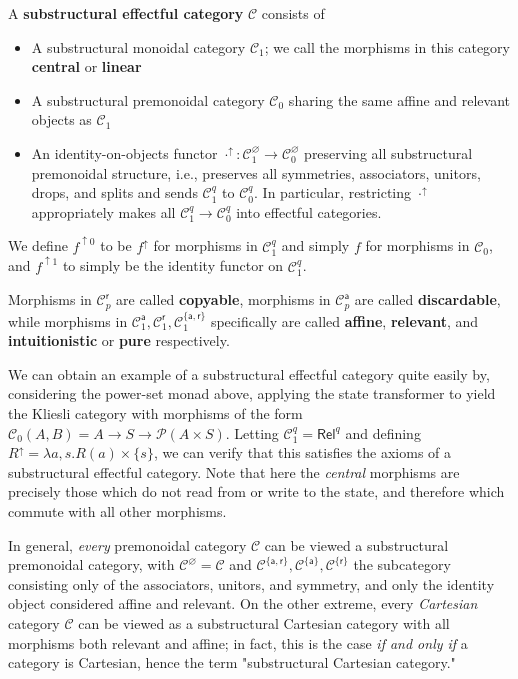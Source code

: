 \documentclass[acmsmall,screen,review]{acmart}
\newcommand{\mc}[1]{\ensuremath{\mathcal{#1}}}
\newcommand{\ms}[1]{\ensuremath{\mathsf{#1}}}
\newcommand{\upg}[2]{{#1}^{\uparrow #2}}
\begin{document}
\begin{definition}
  A \textbf{substructural effectful category} \(\mc{C}\) consists of
  \begin{itemize}
    \item A substructural monoidal category \(\mc{C}_1\); we call the morphisms
    in this category \textbf{central} or \textbf{linear}
    \item A substructural premonoidal category \(\mc{C}_0\) sharing the same
    affine and relevant objects as \(\mc{C}_1\)
    \item An identity-on-objects functor \(\upg{\cdot}{}: \mc{C}_1^\varnothing
    \to \mc{C}_0^\varnothing\) preserving all substructural premonoidal
    structure, i.e., preserves all symmetries, associators, unitors, drops, and
    splits and sends \(\mc{C}_1^q\) to \(\mc{C}_0^q\). In particular,
    restricting \(\upg{\cdot}{}\) appropriately makes all \(\mc{C}_1^q \to
    \mc{C}_0^q\) into effectful categories.
  \end{itemize}
  We define \(\upg{f}{0}\) to be \(\upg{f}{}\) for morphisms in \(\mc{C}_1^q\)
  and simply \(f\) for morphisms in \(\mc{C}_0\), and \(\upg{f}{1}\) to simply
  be the identity functor on \(\mc{C}_1^q\).
 
  Morphisms in \(\mc{C}_p^{\ms{r}}\) are called \textbf{copyable}, morphisms
  in \(\mc{C}_p^{\ms{a}}\) are called \textbf{discardable}, while morphisms
  in \(\mc{C}_1^{\ms{a}}, \mc{C}_1^{\ms{r}}, \mc{C}_1^{\{\ms{a},
  \ms{r}\}}\) specifically are called \textbf{affine}, \textbf{relevant}, and
  \textbf{intuitionistic} or \textbf{pure} respectively.
\end{definition}

We can obtain an example of a substructural effectful category quite easily by,
considering the power-set monad above, applying the state transformer to yield
the Kliesli category with morphisms of the form \(\mc{C}_0(A, B) = A \to S \to
\mc{P}(A \times S)\). Letting \(\mc{C}_1^q = \ms{Rel}^q\) and defining
\(
  \upg{R}{} = \lambda a, s. R(a) \times \{s\}
\), we can verify that this satisfies the axioms of a substructural effectful category.
Note that here the \textit{central} morphisms are precisely those which do not
read from or write to the state, and therefore which commute with all other
morphisms.

In general, \textit{every} premonoidal category \(\mc{C}\) can be viewed a
substructural premonoidal category, with \(\mc{C}^\varnothing = \mc{C}\) and
\(\mc{C}^{\{\ms{a}, \ms{r}\}}, \mc{C}^{\{\ms{a}\}}, \mc{C}^{\{\ms{r}\}}\) the
subcategory consisting only of the associators, unitors, and symmetry, and only
the identity object considered affine and relevant. On the other extreme, every
\textit{Cartesian} category \(\mc{C}\) can be viewed as a substructural
Cartesian category with all morphisms both relevant and affine; in fact, this is
the case \textit{if and only if} a category is Cartesian, hence the term
"substructural Cartesian category."
\end{document}
